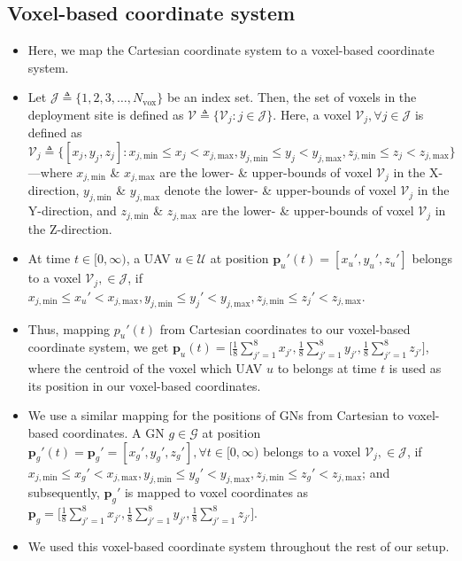 \documentclass{article}
\begin{document}
\subsection{Voxel-based coordinate system}
\begin{itemize}
    \item Here, we map the Cartesian coordinate system to a voxel-based coordinate system.
    \item Let $\mathcal{J}{\triangleq}\{1,2,3,{\dots},N_{\mathrm{vox}}\}$ be an index set. Then, the set of voxels in the deployment site is defined as $\mathcal{V}{\triangleq}\{\mathcal{V}_{j}:j{\in}\mathcal{J}\}$. Here, a voxel $\mathcal{V}_{j},{\forall}j{\in}\mathcal{J}$ is defined as $\mathcal{V}_{j}{\triangleq}\{[x_{j},y_{j},z_{j}]:x_{j,\mathrm{min}}{\leq}x_{j}{<}x_{j,\mathrm{max}},y_{j,\mathrm{min}}{\leq}y_{j}{<}y_{j,\mathrm{max}},z_{j,\mathrm{min}}{\leq}z_{j}{<}z_{j,\mathrm{max}}\}$---where $x_{j,\mathrm{min}}$ \& $x_{j,\mathrm{max}}$ are the lower- \& upper-bounds of voxel $\mathcal{V}_{j}$ in the X-direction, $y_{j,\mathrm{min}}$ \& $y_{j,\mathrm{max}}$ denote the lower- \& upper-bounds of voxel $\mathcal{V}_{j}$ in the Y-direction, and $z_{j,\mathrm{min}}$ \& $z_{j,\mathrm{max}}$ are the lower- \& upper-bounds of voxel $\mathcal{V}_{j}$ in the Z-direction.
    \item At time $t{\in}[0,\infty)$, a UAV $u{\in}\mathcal{U}$ at position $\mathbf{p}_{u}'(t){=}[x_{u}',y_{u}',z_{u}']$ belongs to a voxel $\mathcal{V}_{j},{\in}\mathcal{J}$, if $x_{j,\mathrm{min}}{\leq}x_{u}'{<}x_{j,\mathrm{max}},y_{j,\mathrm{min}}{\leq}y_{j}'{<}y_{j,\mathrm{max}},z_{j,\mathrm{min}}{\leq}z_{j}'{<}z_{j,\mathrm{max}}$.
    \item Thus, mapping $p_{u}'(t)$ from Cartesian coordinates to our voxel-based coordinate system, we get $\mathbf{p}_{u}(t){=}\Big[\frac{1}{8}\sum_{j'{=}1}^{8}x_{j'},\frac{1}{8}\sum_{j'{=}1}^{8}y_{j'},\frac{1}{8}\sum_{j'{=}1}^{8}z_{j'}\Big]$, where the centroid of the voxel which UAV $u$ to belongs at time $t$ is used as its position in our voxel-based coordinates.
    \item We use a similar mapping for the positions of GNs from Cartesian to voxel-based coordinates.
    A GN $g{\in}\mathcal{G}$ at position $\mathbf{p}_{g}'(t){=}\mathbf{p}_{g}'{=}[x_{g}',y_{g}',z_{g}'],{\forall}t{\in}[0,\infty)$ belongs to a voxel $\mathcal{V}_{j},{\in}\mathcal{J}$, if $x_{j,\mathrm{min}}{\leq}x_{g}'{<}x_{j,\mathrm{max}},y_{j,\mathrm{min}}{\leq}y_{g}'{<}y_{j,\mathrm{max}},z_{j,\mathrm{min}}{\leq}z_{g}'{<}z_{j,\mathrm{max}}$; and subsequently, $\mathbf{p}_{g}'$ is mapped to voxel coordinates as $\mathbf{p}_{g}{=}\Big[\frac{1}{8}\sum_{j'{=}1}^{8}x_{j'},\frac{1}{8}\sum_{j'{=}1}^{8}y_{j'},\frac{1}{8}\sum_{j'{=}1}^{8}z_{j'}\Big]$.
    \item We used this voxel-based coordinate system throughout the rest of our setup.
\end{itemize}
\end{document}
